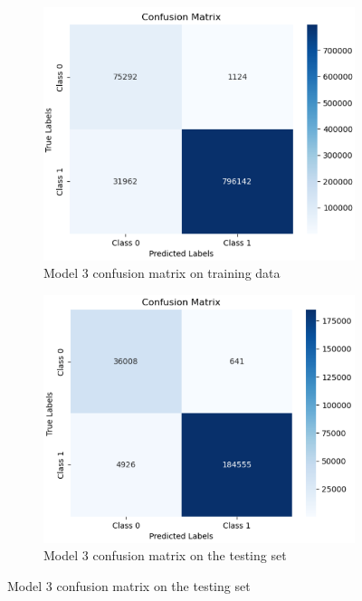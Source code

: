\begin{figure}[H]%
    \centering
    \begin{subfigure}{0.49\textwidth}
        \centering
        \includegraphics[width=\linewidth]{figures/ev/3_cm1.png}
        \caption{Model 3 confusion matrix on training data}
    \label{fig:3_cm1}
    \end{subfigure}
    \begin{subfigure}{0.49\textwidth}
        \centering
         \includegraphics[width=\linewidth]{figures/ev/3_cm2.png}
        \caption{Model 3 confusion matrix on the testing set}
    \label{fig:3_cm2}

\end{subfigure}
\end{figure}
